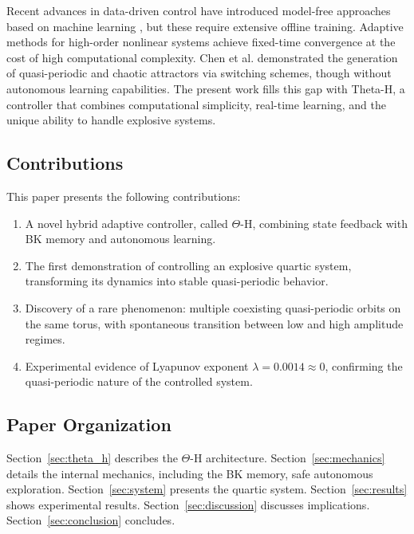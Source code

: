 \documentclass[twocolumn]{article}
\begin{document}
Recent advances in data-driven control have introduced 
model-free approaches based on machine learning \cite{Koeglmayr2026}, 
but these require extensive offline training. Adaptive methods 
for high-order nonlinear systems \cite{Zhang2025} achieve 
fixed-time convergence at the cost of high computational 
complexity. Chen et al. \cite{Chen2007} demonstrated the 
generation of quasi-periodic and chaotic attractors via 
switching schemes, though without autonomous learning 
capabilities. The present work fills this gap with Theta-H, 
a controller that combines computational simplicity, 
real-time learning, and the unique ability to handle 
explosive systems.

\subsection{Contributions}

This paper presents the following contributions:

\begin{enumerate}
    \item A novel hybrid adaptive controller, called $\Theta$-H,
    combining state feedback with BK memory and autonomous learning.
    
    \item The first demonstration of controlling an explosive 
    quartic system, transforming its dynamics into stable 
    quasi-periodic behavior.
    
    \item Discovery of a rare phenomenon: multiple coexisting 
    quasi-periodic orbits on the same torus, with spontaneous 
    transition between low and high amplitude regimes.
    
    \item Experimental evidence of Lyapunov exponent 
    $\lambda = 0.0014 \approx 0$, confirming the quasi-periodic 
    nature of the controlled system.
\end{enumerate}

\subsection{Paper Organization}

Section~\ref{sec:theta_h} describes the $\Theta$-H architecture.
Section~\ref{sec:mechanics} details the internal mechanics, including 
the BK memory, safe autonomous exploration.
Section~\ref{sec:system} presents the quartic system. 
Section~\ref{sec:results} shows experimental results. 
Section~\ref{sec:discussion} discusses implications. 
Section~\ref{sec:conclusion} concludes.
\end{document}

